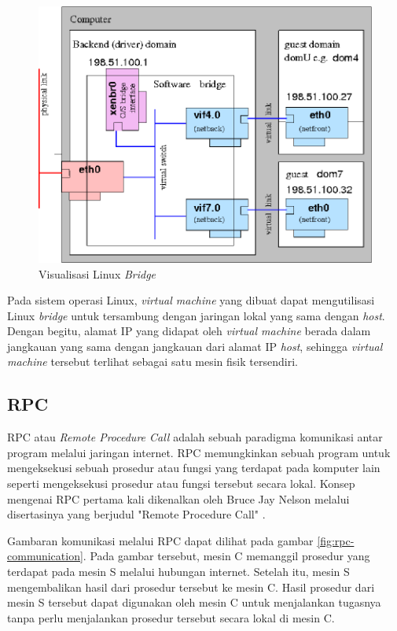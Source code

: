 \begin{figure}[H]
  \centering
  \includegraphics[scale=0.3]{gambar/linux-bridge.png}
  \caption{Visualisasi Linux \emph{Bridge} \parencite{Singh861571}}
  \label{fig:linux-bridge}
\end{figure}

Pada sistem operasi Linux, \emph{virtual machine} yang dibuat dapat mengutilisasi Linux
\emph{bridge} untuk tersambung dengan jaringan lokal yang sama dengan \emph{host}.
Dengan begitu, alamat IP yang didapat oleh \emph{virtual machine} berada dalam jangkauan
yang sama dengan jangkauan dari alamat IP \emph{host}, sehingga \emph{virtual machine} tersebut
terlihat sebagai satu mesin fisik tersendiri.

\subsection{RPC}

RPC atau \emph{Remote Procedure Call} adalah sebuah paradigma komunikasi antar program
melalui jaringan internet. RPC memungkinkan sebuah program untuk mengeksekusi sebuah
prosedur atau fungsi yang terdapat pada komputer lain seperti mengeksekusi prosedur
atau fungsi tersebut secara lokal. Konsep mengenai RPC pertama kali dikenalkan oleh
Bruce Jay Nelson melalui disertasinya yang berjudul "Remote Procedure Call" \parencite{rpc}.

Gambaran komunikasi melalui RPC dapat dilihat pada gambar \ref{fig:rpc-communication}.
Pada gambar tersebut, mesin C memanggil prosedur yang terdapat pada mesin S melalui
hubungan internet. Setelah itu, mesin S mengembalikan hasil dari prosedur tersebut
ke mesin C. Hasil prosedur dari mesin S tersebut dapat digunakan oleh
mesin C untuk menjalankan tugasnya tanpa perlu menjalankan prosedur tersebut
secara lokal di mesin C.

